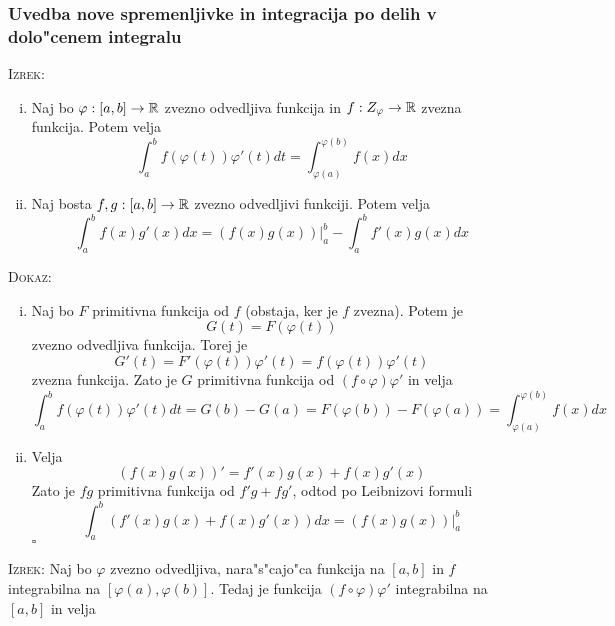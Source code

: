 \subsubsection{Uvedba nove spremenljivke in integracija po delih v dolo"cenem integralu}
\textsc{Izrek:}
\begin{enumerate}[(i)]
	\item  Naj bo $\varphi: [a, b] \to \mathbb{R}$ zvezno odvedljiva funkcija in $f: Z_\varphi \to \mathbb{R}$ zvezna funkcija. Potem velja
	\begin{equation*}
	\int_{a}^{b} f(\varphi(t)) \varphi'(t) dt = \int_{\varphi(a)}^{\varphi(b)} f(x) dx
	\end{equation*}
	
	\item Naj bosta $f, g: [a, b] \to \mathbb{R}$ zvezno odvedljivi funkciji. Potem velja
	\begin{equation*}
	\int_a^b f(x) g'(x) dx = (f(x) g(x)) \rvert_a^b - \int_a^b f'(x) g(x) dx
	\end{equation*}
\end{enumerate}
\textsc{Dokaz:}
\begin{enumerate}[(i)]
	\item Naj bo $F$ primitivna funkcija od $f$ (obstaja, ker je $f$ zvezna). Potem je
	\begin{equation*}
	G(t) = F(\varphi(t))
	\end{equation*}
	zvezno odvedljiva funkcija. Torej je
	\begin{equation*}
	G'(t) = F'(\varphi(t))\varphi'(t) = f(\varphi(t)) \varphi'(t)
	\end{equation*}
	zvezna funkcija. Zato je $G$ primitivna funkcija od $(f \circ \varphi) \varphi'$ in velja
	\begin{equation*}
	\int_a^b f(\varphi(t)) \varphi'(t) dt = G(b) - G(a) = F(\varphi(b)) - F(\varphi(a)) = \int_{\varphi(a)}^{\varphi(b)} f(x) dx
	\end{equation*}
	
	\item Velja
	\begin{equation*}
	(f(x) g(x))' = f'(x)g(x) + f(x) g'(x)
	\end{equation*}
	Zato je $fg$ primitivna funkcija od $f'g + fg'$, odtod po Leibnizovi formuli
	\begin{equation*}
	\int_a^b (f'(x)g(x) + f(x) g'(x))dx = (f(x) g(x)) \rvert_a^b
	\end{equation*}
	\hfill $\square$
\end{enumerate}
%
\textsc{Izrek:} Naj bo $\varphi$ zvezno odvedljiva, nara"s"cajo"ca funkcija na $[a, b]$ in $f$ integrabilna na $[\varphi(a), \varphi(b)]$. Tedaj je funkcija $(f \circ \varphi) \varphi'$ integrabilna na $[a, b]$ in velja

